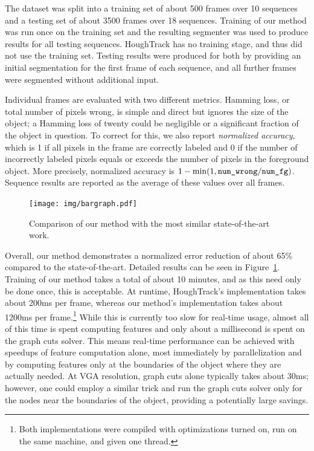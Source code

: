 \documentclass[graybox]{svmult}
\newcommand{\vga}{VGA\xspace}
\begin{document}
The dataset was split into a training set of about 500 frames over 10 sequences and a testing set of about 3500 frames over 18 sequences.  Training of our method was run once on the training set and the resulting segmenter was used to produce results for all testing sequences. HoughTrack has no training stage, and thus did not use the training set.  Testing results were produced for both by providing an initial segmentation for the first frame of each sequence, and all further frames were segmented without additional input.

Individual frames are evaluated with two different metrics.  Hamming loss, or total number of pixels wrong, is simple and direct but ignores the size of the object; a Hamming loss of twenty could be negligible or a significant fraction of the object in question.  To correct for this, we also report \emph{normalized accuracy}, which is 1 if all pixels in the frame are correctly labeled and 0 if the number of incorrectly labeled pixels equals or exceeds the number of pixels in the foreground object.  More precisely, normalized accuracy is $1 - \min(1, \mbox{\texttt{num\_wrong}} / \mbox{\texttt{num\_fg}})$.  Sequence results are reported as the average of these values over all frames.


\begin{figure}
  \centering
  \texttt{[image: img/bargraph.pdf]}
  \caption{Comparison of our method with the most similar state-of-the-art work.}
  \label{fig:bargraph}
  \vspace{50pt}
\end{figure}


Overall, our method demonstrates a normalized error reduction of about 65\% compared to the state-of-the-art.  Detailed results can be seen in Figure~\ref{fig:bargraph}.  Training of our method takes a total of about 10 minutes, and as this need only be done once, this is acceptable. At runtime, HoughTrack's implementation takes about 200ms per frame, whereas our method's implementation takes about 1200ms per frame.\footnote{Both implementations were compiled with optimizations turned on, run on the same machine, and given one thread.} While this is currently too slow for real-time usage, almost all of this time is spent computing features and only about a millisecond is spent on the graph cuts solver.  This means real-time performance can be achieved with speedups of feature computation alone, most immediately by parallelization and by computing features only at the boundaries of the object where they are actually needed.  At \vga resolution, graph cuts alone typically takes about 30ms; however, one could employ a similar trick and run the graph cuts solver only for the nodes near the boundaries of the object, providing a potentially large savings.
\end{document}
